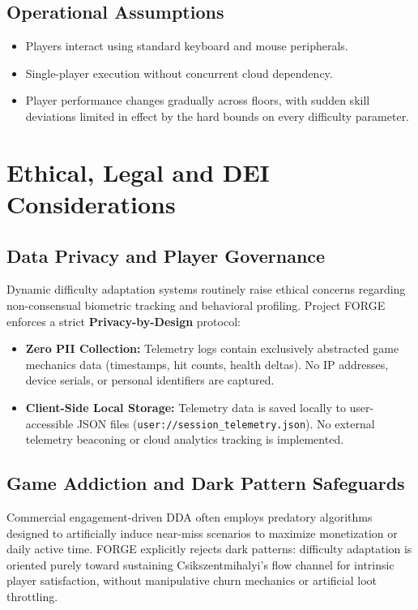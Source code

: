 \subsection*{Operational Assumptions}
\begin{itemize}
    \item Players interact using standard keyboard and mouse peripherals.
    \item Single-player execution without concurrent cloud dependency.
    \item Player performance changes gradually across floors, with sudden skill deviations limited in effect by the hard bounds on every difficulty parameter.
\end{itemize}

\section{Ethical, Legal and DEI Considerations}
\subsection*{Data Privacy and Player Governance}
Dynamic difficulty adaptation systems routinely raise ethical concerns regarding non-consensual biometric tracking and behavioral profiling. Project FORGE enforces a strict \textbf{Privacy-by-Design} protocol:
\begin{itemize}
    \item \textbf{Zero PII Collection:} Telemetry logs contain exclusively abstracted game mechanics data (timestamps, hit counts, health deltas). No IP addresses, device serials, or personal identifiers are captured.
    \item \textbf{Client-Side Local Storage:} Telemetry data is saved locally to user-accessible JSON files (\texttt{user://session\_telemetry.json}). No external telemetry beaconing or cloud analytics tracking is implemented.
\end{itemize}

\subsection*{Game Addiction and Dark Pattern Safeguards}
Commercial engagement-driven DDA often employs predatory algorithms designed to artificially induce near-miss scenarios to maximize monetization or daily active time. FORGE explicitly rejects dark patterns: difficulty adaptation is oriented purely toward sustaining Csikszentmihalyi's flow channel for intrinsic player satisfaction, without manipulative churn mechanics or artificial loot throttling.

